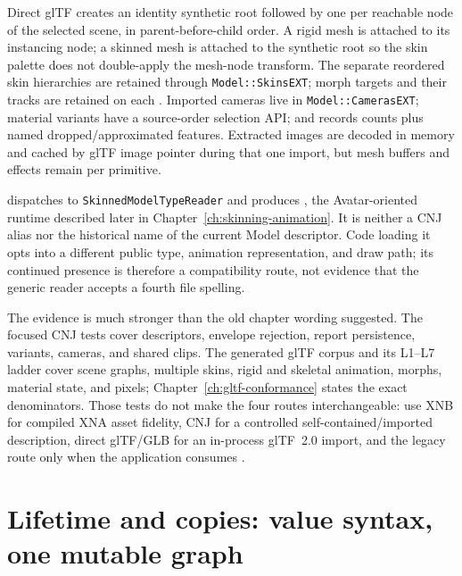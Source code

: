 \begin{description}
        Direct glTF creates an identity synthetic root followed by one  per
        reachable node of the selected scene, in parent-before-child order. A rigid mesh is
        attached to its instancing node; a skinned mesh is attached to the synthetic root so the
        skin palette does not double-apply the mesh-node transform. The separate reordered skin
        hierarchies are retained through \texttt{Model::SkinsEXT}; morph targets and their tracks
        are retained on each . Imported cameras live in
        \texttt{Model::CamerasEXT}; material variants have a source-order selection API; and
         records counts plus named dropped/approximated features.
        Extracted images are
        decoded in memory and cached by glTF image pointer during that one import, but mesh
        buffers and effects remain per primitive.
  \item[The legacy \texttt{.skinnedmodel.json} route]
        dispatches to \texttt{SkinnedModelTypeReader} and produces
        , the Avatar-oriented runtime described later in
        Chapter~\ref{ch:skinning-animation}. It is neither a CNJ alias nor the historical name
        of the current Model descriptor. Code loading it opts into a different public type,
        animation representation, and draw path; its continued presence is therefore a
        compatibility route, not evidence that the generic  reader accepts a
        fourth file spelling.
\end{description}

The evidence is much stronger than the old chapter wording suggested. The focused CNJ tests
cover descriptors, envelope rejection, report persistence, variants, cameras, and shared clips.
The generated glTF corpus and its L1--L7 ladder cover scene graphs, multiple skins, rigid and
skeletal animation, morphs, material state, and pixels; Chapter~\ref{ch:gltf-conformance} states
the exact denominators. Those tests do not make the four routes interchangeable: use XNB for
compiled XNA asset fidelity, CNJ for a controlled self-contained/imported description, direct
glTF/GLB for an in-process glTF~2.0 import, and the legacy route only when the application
consumes .

\section{Lifetime and copies: value syntax, one mutable graph}
\label{sec:model-lifetime-copy}

